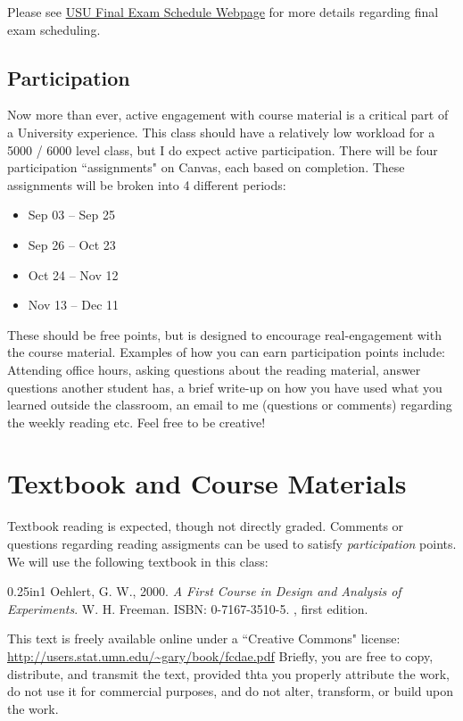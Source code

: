 \documentclass[11pt]{article}\usepackage[]{graphicx}\usepackage[]{xcolor}
\begin{document}
Please see \href{https://catalog.usu.edu/pages/YTabB3DShwqo6hUgogQi}{USU Final Exam Schedule Webpage} for more details regarding final exam scheduling.

\subsection{Participation}

Now more than ever, active engagement with course material is a critical part of a University experience.
This class should have a relatively low workload for a 5000 / 6000 level class, but I do expect active participation.
There will be four participation ``assignments" on Canvas, each based on completion.
These assignments will be broken into 4 different periods: 
\begin{itemize}
  \item Sep 03 -- Sep 25
  \item Sep 26 -- Oct 23
  \item Oct 24 -- Nov 12
  \item Nov 13 -- Dec 11
\end{itemize}
These should be free points, but is designed to encourage real-engagement with the course material.
Examples of how you can earn participation points include: Attending office hours, asking questions about the reading material, answer questions another student has, a brief write-up on how you have used what you learned outside the classroom, an email to me (questions or comments) regarding the weekly reading etc. 
Feel free to be creative!

\section{Textbook and Course Materials}

Textbook reading is expected, though not directly graded. 
Comments or questions regarding reading assigments can be used to satisfy \emph{participation} points.
We will use the following textbook in this class:

\begin{hangparas}{0.25in}{1}
Oehlert, G. W., 2000. \emph{A First Course in Design and Analysis of Experiments}. W. H. Freeman. ISBN: 0-7167-3510-5. 
, first edition.
\end{hangparas}

This text is freely available online under a ``Creative Commons" license: \url{http://users.stat.umn.edu/~gary/book/fcdae.pdf} 
Briefly, you are free to copy, distribute, and transmit the text, provided thta you properly attribute the work, do not use it for commercial purposes, and do not alter, transform, or build upon the work.
\end{document}
